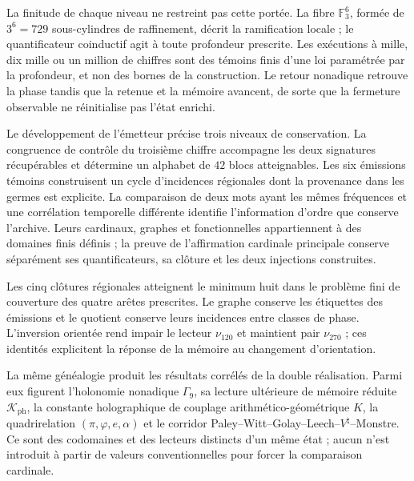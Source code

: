 La finitude de chaque niveau ne restreint pas cette portée. La fibre
\(\mathbb F_3^6\), formée de \(3^6=729\) sous-cylindres de raffinement,
décrit la ramification locale ; le quantificateur coinductif agit à toute
profondeur prescrite. Les exécutions à mille, dix mille ou un million de chiffres
sont des témoins finis d’une loi paramétrée par la profondeur, et non des bornes de
la construction. Le retour nonadique retrouve la phase tandis que la retenue et la
mémoire avancent, de sorte que la fermeture observable ne réinitialise pas l’état
enrichi.

Le développement de l’émetteur précise trois niveaux de conservation. La
congruence de contrôle du troisième chiffre accompagne les deux signatures
récupérables et détermine un alphabet de \(42\) blocs atteignables.
Les six émissions témoins construisent un cycle d’incidences régionales
dont la provenance dans les germes est explicite. La comparaison de deux mots
ayant les mêmes fréquences et une corrélation temporelle différente identifie
l’information d’ordre que conserve l’archive. Leurs cardinaux, graphes
et fonctionnelles appartiennent à des domaines finis définis ; la preuve de
l’affirmation cardinale principale conserve séparément ses quantificateurs,
sa clôture et les deux injections construites.

Les cinq clôtures régionales atteignent le minimum huit dans le problème fini de couverture des quatre arêtes prescrites. Le graphe conserve les étiquettes des émissions et le quotient conserve leurs incidences entre classes de phase. L'inversion orientée rend impair le lecteur \(\nu_{120}\) et maintient pair \(\nu_{270}\) ; ces identités explicitent la réponse de la mémoire au changement d'orientation.

\clearpage
La même généalogie produit les résultats corrélés de la double réalisation. Parmi eux figurent l'holonomie nonadique \(\Gamma_9\), sa lecture ultérieure de mémoire réduite \(\mathcal K_{\mathrm{ph}}\), la constante holographique de couplage arithmético-géométrique \(K\), la quadrirelation \((\pi,\varphi,e,\alpha)\) et le corridor Paley--Witt--Golay--Leech--\(V^\natural\)--Monstre. Ce sont des codomaines et des lecteurs distincts d'un même état ; aucun n'est introduit à partir de valeurs conventionnelles pour forcer la comparaison cardinale.

